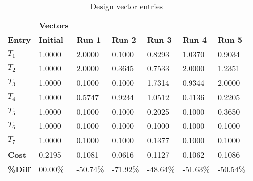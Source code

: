 \begin{table}[H]
\centering
\begin{tabular}{lllllll}
\textbf{} & \cellcolor[HTML]{EFEFEF}\textbf{Vectors} & \textbf{} & \textbf{} & \textbf{} & \textbf{} & \textbf{} \\
\rowcolor[HTML]{EFEFEF} \cellcolor[HTML]{EFEFEF}\textbf{Entry} & \cellcolor[HTML]{EFEFEF}\textbf{Initial} & \cellcolor[HTML]{EFEFEF}\textbf{Run 1} & \cellcolor[HTML]{EFEFEF}\textbf{Run 2} & \cellcolor[HTML]{EFEFEF}\textbf{Run 3} & \cellcolor[HTML]{EFEFEF}\textbf{Run 4} & \cellcolor[HTML]{EFEFEF}\textbf{Run 5} \\
$T_1$ & 1.0000 & 2.0000 & 0.1000 & 0.8293 & 1.0370 & 0.9034 \\
$T_2$ & 1.0000 & 2.0000 & 0.3645 & 0.7533 & 2.0000 & 1.2351 \\
$T_3$ & 1.0000 & 0.1000 & 0.1000 & 1.7314 & 0.9344 & 2.0000 \\
$T_4$ & 1.0000 & 0.5747 & 0.9234 & 1.0512 & 0.4136 & 0.2205 \\
$T_5$ & 1.0000 & 0.1000 & 0.1000 & 0.2025 & 0.1000 & 0.3650 \\
$T_6$ & 1.0000 & 0.1000 & 0.1000 & 0.1000 & 0.1000 & 0.1000 \\
$T_7$ & 1.0000 & 0.1000 & 0.1000 & 0.1377 & 0.1000 & 0.1000 \\
\rowcolor[HTML]{EFEFEF} 
\cellcolor[HTML]{EFEFEF}\textbf{Cost} & \cellcolor[HTML]{EFEFEF}0.2195 & 0.1081 & 0.0616 & 0.1127 & 0.1062 & 0.1086 \\
\rowcolor[HTML]{EFEFEF} 
\cellcolor[HTML]{EFEFEF}\textbf{\%Diff} & \cellcolor[HTML]{EFEFEF} 00.00\% &-50.74\% & -71.92\% & -48.64\% & -51.63\% & -50.54\% \\
\end{tabular}
\caption{Design vector entries}
\label{tab:DesignVectorEntries}
\end{table}